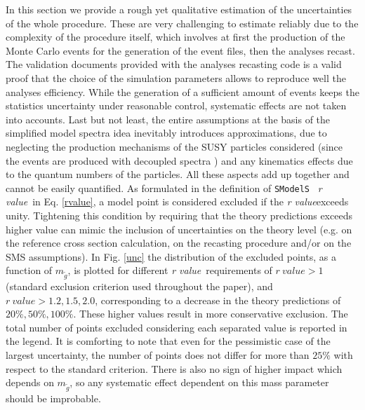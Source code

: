 \documentclass[a4paper,11pt]{article}
\newcommand{\SMO}{\texttt{SModelS\xspace}}
\newcommand{\MGLU}{$ m _{ \tilde g } $\xspace}
\newcommand{\RVALUE}{\textit{r value}}
\begin{document}
In this section we provide a rough yet qualitative estimation of the uncertainties of the whole procedure. These are very challenging to estimate reliably due to the complexity of the procedure itself, which involves at first the production of the Monte Carlo events for the generation of the event files, then the analyses recast. The validation documents provided with the analyses recasting code is a valid proof that the choice of the simulation parameters allows to reproduce well the analyses efficiency. While the generation of a sufficient amount of events keeps the statistics uncertainty under reasonable control, systematic effects are not taken into accounts. Last but not least, the entire assumptions at the basis of the simplified model spectra idea inevitably introduces approximations, due to neglecting the production mechanisms of the SUSY particles considered (since the events are produced with decoupled spectra ) and any kinematics effects due to the quantum numbers of the particles. All these aspects add up together and cannot be easily quantified. As formulated in the definition of \SMO~ \RVALUE~in Eq. \ref{rvalue}, a model point is considered excluded if the \RVALUE exceeds unity. Tightening this condition by requiring that the theory predictions exceeds higher value can mimic the inclusion of uncertainties on the theory level (e.g. on the reference cross section calculation, on the recasting procedure and/or on the SMS assumptions). 
In Fig. \ref{unc} the distribution of the excluded points, as a function of \MGLU, is plotted for different \RVALUE~requirements of $r\ value >1$ (standard exclusion criterion used throughout the paper), and $r\ value >1.2 , 1.5,2.0$, corresponding to a decrease in the theory predictions of $20\%,50\%,100\%$. These higher values result in more conservative exclusion. The total number of points excluded considering each separated value is reported in the legend. It is comforting to note that even for the pessimistic case of the largest uncertainty, the number of points does not differ for more than $25\%$ with respect to the standard criterion. There is also no sign of higher impact which depends on \MGLU, so any systematic effect dependent on this mass parameter should be improbable. 
\end{document}
